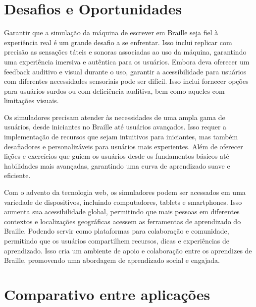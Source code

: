 \section{Desafios e Oportunidades}

Garantir que a simulação da máquina de escrever em Braille seja fiel à experiência real é um grande desafio a se enfrentar. Isso inclui replicar com precisão as sensações táteis e sonoras associadas ao uso da máquina, garantindo uma experiência imersiva e autêntica para os usuários. Embora deva oferecer um feedback auditivo e visual durante o uso, garantir a acessibilidade para usuários com diferentes necessidades sensoriais pode ser difícil. Isso inclui fornecer opções para usuários surdos ou com deficiência auditiva, bem como aqueles com limitações visuais.

Os simuladores precisam atender às necessidades de uma ampla gama de usuários, desde iniciantes no Braille até usuários avançados. Isso requer a implementação de recursos que sejam intuitivos para iniciantes, mas também desafiadores e personalizáveis para usuários mais experientes. Além de oferecer lições e exercícios que guiem os usuários desde os fundamentos básicos até habilidades mais avançadas, garantindo uma curva de aprendizado suave e eficiente.

Com o advento da tecnologia web, os simuladores podem ser acessados em uma variedade de dispositivos, incluindo computadores, tablets e smartphones. Isso aumenta sua acessibilidade global, permitindo que mais pessoas em diferentes contextos e localizações geográficas acessem as ferramentas de aprendizado do Braille. Podendo servir como plataformas para colaboração e comunidade, permitindo que os usuários compartilhem recursos, dicas e experiências de aprendizado. Isso cria um ambiente de apoio e colaboração entre os aprendizes de Braille, promovendo uma abordagem de aprendizado social e engajada.

\section{Comparativo entre aplicações}


